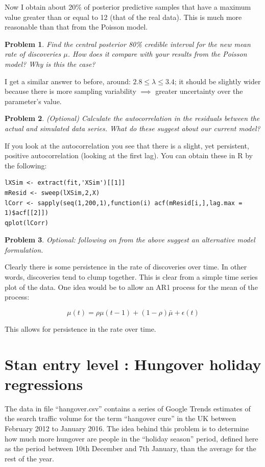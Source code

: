 \documentclass{article}
\newtheorem{problem}{Problem}[section]
\begin{document}
Now I obtain about 20\% of posterior predictive samples that have a maximum value greater than or equal to 12 (that of the real data). This is much more reasonable than that from the Poisson model.

\begin{problem}
	Find the central posterior 80\% credible interval for the new mean rate of discoveries $\mu$. How does it compare with your results from the Poisson model? Why is this the case?
\end{problem}

I get a similar answer to before, around: $2.8\leq\lambda\leq 3.4$; it should be slightly wider because there is more sampling variability $\implies$ greater uncertainty over the parameter's value.

\begin{problem}
	(Optional) Calculate the autocorrelation in the residuals between the actual and simulated data series. What do these suggest about our current model?
\end{problem}

If you look at the autocorrelation you see that there is a slight, yet persistent, positive autocorrelation (looking at the first lag). You can obtain these in R by the following:

\begin{verbatim}
lXSim <- extract(fit,'XSim')[[1]]
mResid <- sweep(lXSim,2,X)
lCorr <- sapply(seq(1,200,1),function(i) acf(mResid[i,],lag.max = 1)$acf[[2]])
qplot(lCorr)
\end{verbatim}

\begin{problem}
	Optional: following on from the above suggest an alternative model formulation.
\end{problem}

Clearly there is some persistence in the rate of discoveries over time. In other words, discoveries tend to clump together. This is clear from a simple time series plot of the data. One idea would be to allow an AR1 process for the mean of the process:

\begin{equation}
\mu(t) = \rho \mu(t-1) + (1-\rho) \bar{\mu} + \epsilon(t)
\end{equation}

This allows for persistence in the rate over time.


\section{Stan entry level : Hungover holiday regressions}
The data in file ``hangover.csv'' contains a series of Google Trends estimates of the search traffic volume for the term ``hangover cure'' in the UK between February 2012 to January 2016. The idea behind this problem is to determine how much more hungover are people in the ``holiday season'' period, defined here as the period between 10th December and 7th January, than the average for the rest of the year.
\end{document}
